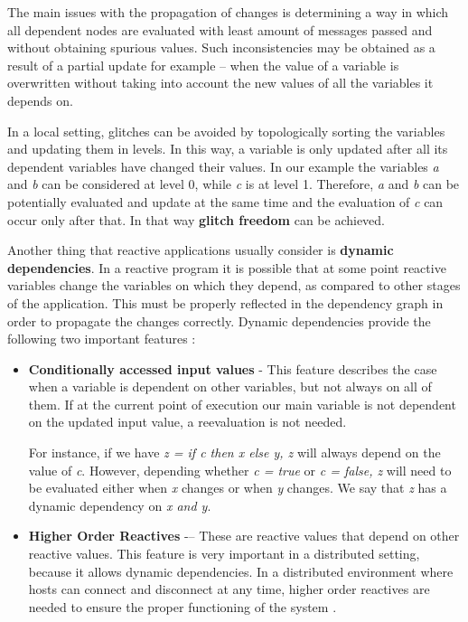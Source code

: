 \documentclass{sigplanconf}
\begin{document}
The main issues with the propagation of changes is determining a way in which all dependent nodes are evaluated with least amount of messages passed and without obtaining spurious values. Such inconsistencies may be obtained as a result of a partial update for example -- when the value of a variable is overwritten without taking into account the new values of all the variables it depends on. 

In a local setting, glitches can be avoided by topologically sorting the variables and updating them in levels. In this way, a variable is only updated after all its dependent variables have changed their values. In our example the variables \textit{a} and \textit{b} can be considered at level 0, while \textit{c} is at level 1. Therefore, \textit{a} and \textit{b} can be potentially evaluated and update at the same time and the evaluation of \textit{c} can occur only after that. In that way \textbf{glitch freedom} can be achieved.

Another thing that reactive applications usually consider is \textbf{dynamic dependencies}. In a reactive program it is possible that at some point reactive variables change the variables on which they depend, as compared to other stages of the application. This must be properly reflected in the dependency graph in order to propagate the changes correctly. Dynamic dependencies provide the following two important features \cite{sidup}:

\begin{itemize} 
\item\textbf{Conditionally accessed input values} - This feature describes the case when a variable is dependent on other variables, but not always on all of them. If at the current point of execution our main variable is not dependent on the updated input value, a reevaluation is not needed.

For instance, if we have \textit{z = if c then x else y, z} will always depend on the value of \textit{c}. However, depending whether \textit{c = true} or \textit{c = false, z} will need to be evaluated either when \textit{x} changes or when \textit{y} changes. We say that \textit{z} has a dynamic dependency on \textit{x and y}.

\item\textbf{Higher Order Reactives} -– These are reactive values that depend on other reactive values. This feature is very important in a distributed setting, because it allows dynamic dependencies. In a distributed environment where hosts can connect and disconnect at any time, higher order reactives are needed to ensure the proper functioning of the system \cite{sidup}.

\end{itemize}
\end{document}

